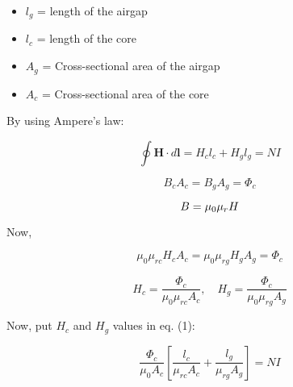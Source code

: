 \documentclass{article}
\begin{document}
\huge
\begin{itemize}
    \item \( l_g \) = length of the airgap
    \item \( l_c \) = length of the core
    \item \( A_g \) = Cross-sectional area of the airgap
    \item \( A_c \) = Cross-sectional area of the core
\end{itemize}

By using Ampere's law:

\begin{equation}
    \oint \mathbf{H} \cdot d\mathbf{l} = H_c l_c + H_g l_g = NI \tag{1}
\end{equation}





\begin{equation}
    B_c A_c = B_g A_g = \Phi_c \tag{2}
\end{equation}

\vspace{0.5cm} %
\begin{equation*}
   \Huge  {B} = \mu_0 \mu_r {H}
\end{equation*}

Now, 

\begin{equation}
    \mu_0 \mu_{rc} H_c A_c = \mu_0 \mu_{rg} H_g A_g = \Phi_c \tag{3}
\end{equation}

\begin{equation*}
    H_c = \frac{\Phi_c}{\mu_0\mu_{rc} A_c}, \quad H_g = \frac{\Phi_c}{\mu_0\mu_{rg} A_g}
\end{equation*}

Now, put \( H_c \) and \( H_g \) values in eq. (1):

\begin{equation}
    \frac{\Phi_c}{\mu_0 A_c} \left[ \frac{l_c}{\mu_{rc} A_c} + \frac{l_g}{\mu_{rg} A_g} \right] = NI
\end{equation}
\end{document}
